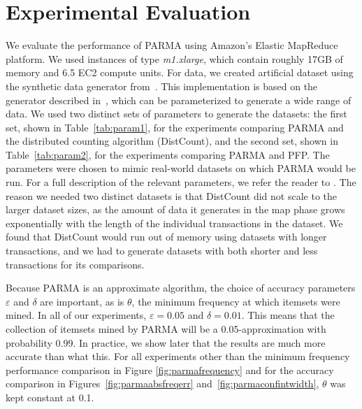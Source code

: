 \section{Experimental Evaluation}
\label{sec:parmaeval}

We evaluate the performance of PARMA using Amazon's Elastic
MapReduce platform. We used instances of type \emph{m1.xlarge}, which
contain roughly 17GB of memory and 6.5 EC2 compute units.
For data, we created artificial dataset using the synthetic data
generator from~\citep{ARTool}. This implementation is based on the
generator described in~\citep{AgrawalS94}, which can be parameterized to generate a wide
range of data. We used two distinct sets of parameters to generate the
datasets: the first set, shown in Table~\ref{tab:param1}, for the experiments
comparing PARMA and the distributed counting algorithm
(DistCount), and the second set, shown in Table~\ref{tab:param2},
for the experiments comparing PARMA and PFP.
The parameters were
chosen to mimic real-world datasets on which PARMA would be run. For a
full description of the relevant parameters, we refer the reader to
\citep{AgrawalS94}.  
The reason we needed two distinct datasets is that DistCount did not scale to
the larger dataset sizes,  as the amount of data it generates in the map phase
grows exponentially with the length of the individual transactions in the
dataset.  We found that DistCount would run out of memory using datasets with
longer transactions, and we had to generate datasets with both shorter and less
transactions for its comparisons. 

Because PARMA is an approximate algorithm, the choice of accuracy
parameters $\varepsilon$ and $\delta$ are important, as is $\theta$,
the minimum frequency at which itemsets were mined. In all of our
experiments, $\varepsilon = 0.05$ and $\delta = 0.01$. This means that
the collection of itemsets mined by PARMA will be a 0.05-approximation with
probability 0.99. In practice, we show later that the results are
much more accurate than what this. For all experiments other than the
minimum frequency performance comparison in Figure \ref{fig:parmafrequency} and for
the accuracy comparison in Figures~\ref{fig:parmaabsfreqerr}
and~\ref{fig:parmaconfintwidth}, $\theta$ was kept constant at 0.1.

